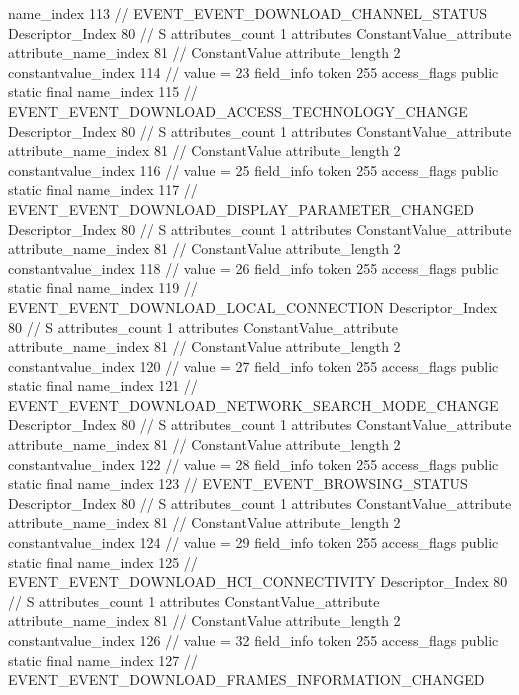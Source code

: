 {{{{{				name_index	113		// EVENT_EVENT_DOWNLOAD_CHANNEL_STATUS
				Descriptor_Index	80		// S
				attributes_count	1
				attributes {
				ConstantValue_attribute {
					attribute_name_index	81		// ConstantValue
					attribute_length	2
					constantvalue_index	114		// value = 23
				}
				}
			}
			field_info {
				token	255
				access_flags	public static final
				name_index	115		// EVENT_EVENT_DOWNLOAD_ACCESS_TECHNOLOGY_CHANGE
				Descriptor_Index	80		// S
				attributes_count	1
				attributes {
				ConstantValue_attribute {
					attribute_name_index	81		// ConstantValue
					attribute_length	2
					constantvalue_index	116		// value = 25
				}
				}
			}
			field_info {
				token	255
				access_flags	public static final
				name_index	117		// EVENT_EVENT_DOWNLOAD_DISPLAY_PARAMETER_CHANGED
				Descriptor_Index	80		// S
				attributes_count	1
				attributes {
				ConstantValue_attribute {
					attribute_name_index	81		// ConstantValue
					attribute_length	2
					constantvalue_index	118		// value = 26
				}
				}
			}
			field_info {
				token	255
				access_flags	public static final
				name_index	119		// EVENT_EVENT_DOWNLOAD_LOCAL_CONNECTION
				Descriptor_Index	80		// S
				attributes_count	1
				attributes {
				ConstantValue_attribute {
					attribute_name_index	81		// ConstantValue
					attribute_length	2
					constantvalue_index	120		// value = 27
				}
				}
			}
			field_info {
				token	255
				access_flags	public static final
				name_index	121		// EVENT_EVENT_DOWNLOAD_NETWORK_SEARCH_MODE_CHANGE
				Descriptor_Index	80		// S
				attributes_count	1
				attributes {
				ConstantValue_attribute {
					attribute_name_index	81		// ConstantValue
					attribute_length	2
					constantvalue_index	122		// value = 28
				}
				}
			}
			field_info {
				token	255
				access_flags	public static final
				name_index	123		// EVENT_EVENT_BROWSING_STATUS
				Descriptor_Index	80		// S
				attributes_count	1
				attributes {
				ConstantValue_attribute {
					attribute_name_index	81		// ConstantValue
					attribute_length	2
					constantvalue_index	124		// value = 29
				}
				}
			}
			field_info {
				token	255
				access_flags	public static final
				name_index	125		// EVENT_EVENT_DOWNLOAD_HCI_CONNECTIVITY
				Descriptor_Index	80		// S
				attributes_count	1
				attributes {
				ConstantValue_attribute {
					attribute_name_index	81		// ConstantValue
					attribute_length	2
					constantvalue_index	126		// value = 32
				}
				}
			}
			field_info {
				token	255
				access_flags	public static final
				name_index	127		// EVENT_EVENT_DOWNLOAD_FRAMES_INFORMATION_CHANGED
}}}}}
